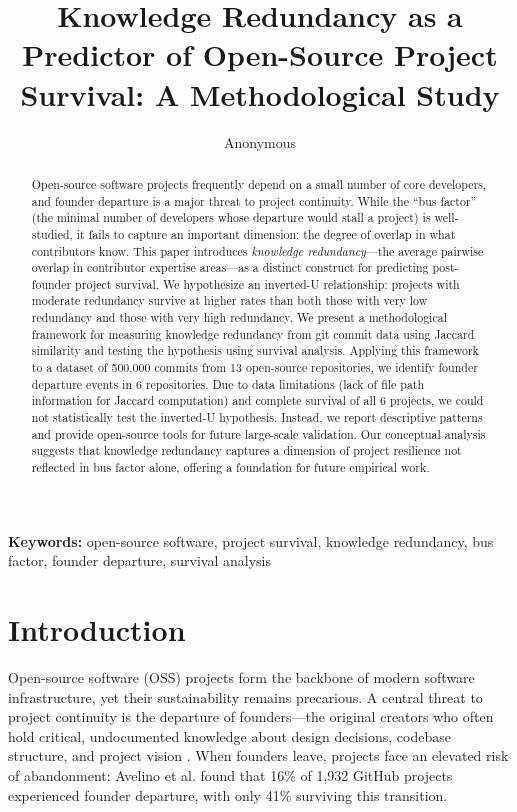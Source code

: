 \documentclass[11pt,letterpaper]{article}
\title{Knowledge Redundancy as a Predictor of Open-Source Project Survival: A Methodological Study}
\author{Anonymous}
\date{}
\begin{document}
\maketitle

\begin{abstract}
Open-source software projects frequently depend on a small number of core developers, and founder departure is a major threat to project continuity. While the ``bus factor'' (the minimal number of developers whose departure would stall a project) is well-studied, it fails to capture an important dimension: the degree of overlap in what contributors know. This paper introduces \textit{knowledge redundancy}---the average pairwise overlap in contributor expertise areas---as a distinct construct for predicting post-founder project survival. We hypothesize an inverted-U relationship: projects with moderate redundancy survive at higher rates than both those with very low redundancy and those with very high redundancy. We present a methodological framework for measuring knowledge redundancy from git commit data using Jaccard similarity and testing the hypothesis using survival analysis. Applying this framework to a dataset of 500,000 commits from 13 open-source repositories, we identify founder departure events in 6 repositories. Due to data limitations (lack of file path information for Jaccard computation) and complete survival of all 6 projects, we could not statistically test the inverted-U hypothesis. Instead, we report descriptive patterns and provide open-source tools for future large-scale validation. Our conceptual analysis suggests that knowledge redundancy captures a dimension of project resilience not reflected in bus factor alone, offering a foundation for future empirical work.
\end{abstract}

\noindent\textbf{Keywords:} open-source software, project survival, knowledge redundancy, bus factor, founder departure, survival analysis

\section{Introduction}

Open-source software (OSS) projects form the backbone of modern software infrastructure, yet their sustainability remains precarious. A central threat to project continuity is the departure of founders---the original creators who often hold critical, undocumented knowledge about design decisions, codebase structure, and project vision \cite{Avelino2019}. When founders leave, projects face an elevated risk of abandonment: Avelino et al. \cite{Avelino2019} found that 16\% of 1,932 GitHub projects experienced founder departure, with only 41\% surviving this transition.
\end{document}
